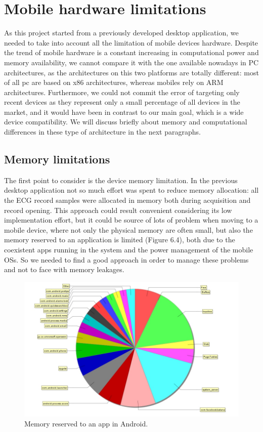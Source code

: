 \section{Mobile hardware limitations}
As this project started from a previously developed desktop application, we needed to take into account all the limitation of mobile devices hardware. Despite the trend of mobile hardware is a constant increasing in computational power and memory availability, we cannot compare it with the one available nowadays in PC architectures, as the architectures on this two platforms are totally different: most of all pc are based on x86 architectures, whereas mobiles rely on ARM architectures. Furthermore, we could not commit the error of targeting only recent devices as they represent only a small percentage of all devices in the market, and it would have been in contrast to our main goal, which is a wide device compatibility.  We will discuss briefly about memory and computational differences in these type of architecture in the next paragraphs.

\subsection{Memory limitations}
The first point to consider is the device memory limitation. In the previous desktop application not so much effort was spent to reduce memory allocation: all the ECG record samples were allocated in memory both during acquisition and record opening. This approach could result convenient considering its low implementation effort, but it could be source of lots of problem when moving to a mobile device, where not only the physical memory are often small, but also the memory reserved to an application is limited (Figure 6.4), both due to the coexistent apps running in the system and the power management of the mobile OSs. So we needed to find a good approach in order to manage these problems and not to face with memory leakages.
\begin{figure}[ht!]
	\centering
	\includegraphics[width=120mm]{figures/ch6/4.png}
	\caption{Memory reserved to an app in Android.}
	\label{fig6.4}
\end{figure}

